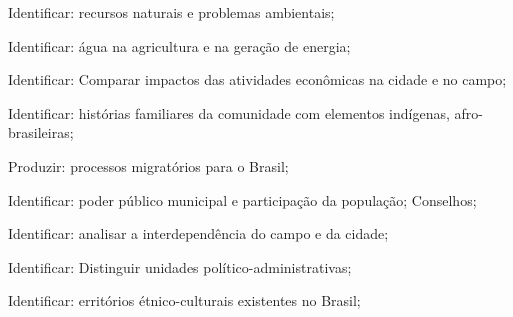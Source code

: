  Identificar: recursos naturais e problemas ambientais;

 Identificar: água na agricultura e na geração de energia; 

 Identificar: Comparar impactos das atividades econômicas na cidade e no campo;

 Identificar: histórias familiares da comunidade com elementos indígenas, afro-brasileiras;

 Produzir: processos migratórios para o Brasil;

 Identificar: poder público municipal e participação da população; Conselhos;

 Identificar: analisar a interdependência do campo e da cidade;

 Identificar: Distinguir unidades político-administrativas;

 Identificar: erritórios étnico-culturais existentes no Brasil;

